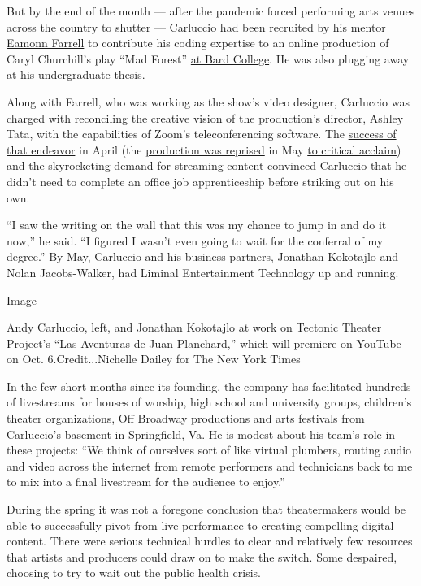 But by the end of the month --- after the pandemic forced performing
arts venues across the country to shutter --- Carluccio had been
recruited by his mentor \href{http://www.eamonnsgarden.com/}{Eamonn
Farrell} to contribute his coding expertise to an online production of
Caryl Churchill's play ``Mad Forest''
\href{https://fishercenter.bard.edu/events/spring-mainstage-2020}{at
Bard College}. He was also plugging away at his undergraduate thesis.

Along with Farrell\href{http://www.eamonnsgarden.com/}{,} who was
working as the show's video designer, Carluccio was charged with
reconciling the creative vision of the production's director, Ashley
Tata, with the capabilities of Zoom's teleconferencing software. The
\href{https://fishercenter.bard.edu/events/the-making-of-mad-forest/}{success
of that endeavor} in April (the
\href{https://www.tfana.org/current-season/digital-programming/madforest}{production
was reprised} in May
\href{https://www.nytimes3xbfgragh.onion/2020/05/24/theater/mad-forest-livestream.html}{to
critical acclaim}) and the skyrocketing demand for streaming content
convinced Carluccio that he didn't need to complete an office job
apprenticeship before striking out on his own.

``I saw the writing on the wall that this was my chance to jump in and
do it now,'' he said. ``I figured I wasn't even going to wait for the
conferral of my degree.'' By May, Carluccio and his business partners,
Jonathan Kokotajlo and Nolan Jacobs-Walker, had Liminal Entertainment
Technology up and running.

Image

Andy Carluccio, left, and Jonathan Kokotajlo at work on Tectonic Theater
Project's ``Las Aventuras de Juan Planchard,'' which will premiere on
YouTube on Oct. 6.Credit...Nichelle Dailey for The New York Times

In the few short months since its founding, the company has facilitated
hundreds of livestreams for houses of worship, high school and
university groups, children's theater organizations, Off Broadway
productions and arts festivals from Carluccio's basement in Springfield,
Va. He is modest about his team's role in these projects: ``We think of
ourselves sort of like virtual plumbers, routing audio and video across
the internet from remote performers and technicians back to me to mix
into a final livestream for the audience to enjoy.''

During the spring it was not a foregone conclusion that theatermakers
would be able to successfully pivot from live performance to creating
compelling digital content. There were serious technical hurdles to
clear and relatively few resources that artists and producers could draw
on to make the switch. Some despaired, choosing to try to wait out the
public health crisis.

